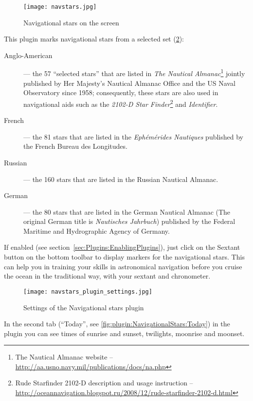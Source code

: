 \begin{figure}[ht]
\texttt{[image: navstars.jpg]}
\caption{Navigational stars on the screen}
\label{fig:plugin:NavigationalStars}
\end{figure}

\noindent This plugin marks navigational stars from a selected set (\ref{fig:plugin:NavigationalStars:Settings}):
\begin{description}
	\item[Anglo-American] --- the 57 ``selected stars'' that are listed in \emph{The Nautical Almanac}\footnote{The Nautical Almanac
		website -- \url{http://aa.usno.navy.mil/publications/docs/na.php}} jointly published by Her Majesty's Nautical Almanac Office and the US Naval Observatory since 1958; consequently, these stars are also used in navigational aids such as the \emph{2102-D Star Finder}\footnote{Rude Starfinder 2102-D
		description and usage instruction --
		\url{http://oceannavigation.blogspot.ru/2008/12/rude-starfinder-2102-d.html}} and \emph{Identifier}. 
	\item[French] --- the 81 stars that are listed in the \emph{Ephémérides Nautiques} published by the French Bureau des Longitudes.
	\item[Russian] --- the 160 stars that are listed in the Russian Nautical Almanac.
	\item[German] --- the 80 stars that are listed in the German Nautical Almanac (The original German title is \textit{Nautisches Jahrbuch}) published by the Federal Maritime and Hydrographic Agency of Germany.
\end{description}
If enabled (see section~\ref{sec:Plugins:EnablingPlugins}), just click
on the Sextant button  on
the bottom toolbar to display markers for the navigational stars. This
can help you in training your skills in astronomical navigation before
you cruise the ocean in the traditional way, with your sextant and
chronometer.

\begin{figure}[htbp]
	\centering\texttt{[image: navstars\_plugin\_settings.jpg]}
	\caption{Settings of the Navigational stars plugin}
	\label{fig:plugin:NavigationalStars:Settings}
\end{figure}

In the second tab (``Today'', see  \ref{fig:plugin:NavigationalStars:Today}) in the plugin you can see times of sunrise and sunset, twilights, moonrise and moonset. 

